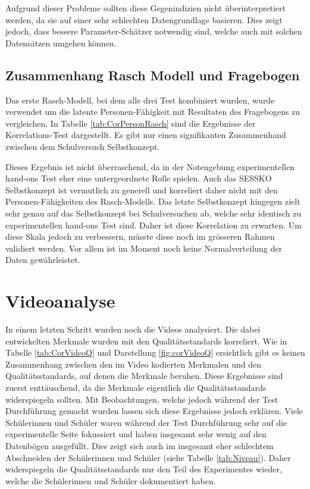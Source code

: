 Aufgrund dieser Probleme sollten diese Gegenindizien nicht überinterpretiert werden, da sie auf einer sehr schlechten Datengrundlage basieren. Dies zeigt jedoch, dass bessere Parameter-Schätzer notwendig sind, welche auch mit solchen Datensätzen umgehen können.

\subsection{Zusammenhang Rasch Modell und Fragebogen}

Das erste Rasch-Modell, bei dem alle drei Test kombiniert wurden, wurde verwendet um die latente Personen-Fähigkeit mit Resultaten des Fragebogens zu vergleichen. In Tabelle \ref{tab:CorPersonRasch} sind die Ergebnisse der Korrelations-Test dargestellt. Es gibt nur einen signifikanten Zusammenhand zwischen dem Schulversuch Selbstkonzept. 

Dieses Ergebnis ist nicht überraschend, da in der Notengebung experimentellen hand-ons Test eher eine untergeordnete Rolle spielen. Auch das SESSKO Selbstkonzept \citep{Schone2002} ist vermutlich zu generell und korreliert daher nicht mit den Personen-Fähigkeiten des Rasch-Modells. Das letzte Selbstkonzept hingegen zielt sehr genau auf das Selbstkonzept bei Schulversuchen ab, welche sehr identisch zu experimentellen hand-ons Test sind. Daher ist diese Korrelation zu erwarten. Um diese Skala jedoch zu verbessern, müsste diese noch im grösseren Rahmen validiert werden. Vor allem ist im Moment noch keine Normalverteilung der Daten gewährleistet.

\section{Videoanalyse}

In einem letzten Schritt wurden noch die Videos analysiert. Die dabei entwickelten Merkmale wurden mit den Qualitätsstandards korreliert. Wie in Tabelle \ref{tab:CorVideoQ} und Darstellung \ref{fig:corVideoQ} ersichtlich gibt es keinen Zusammenhang zwischen den im Video kodierten Merkmalen und den Qualitätsstandards, auf denen die Merkmale beruhen. Diese Ergebnisse sind zuerst enttäuschend, da die Merkmale eigentlich die Qualitätsstandards widerspiegeln sollten. Mit Beobachtungen, welche jedoch während der Test Durchführung gemacht wurden lassen sich diese Ergebnisse jedoch erklären. Viele Schülerinnen und Schüler waren während der Test Durchführung sehr auf die experimentelle Seite fokussiert und haben insgesamt sehr wenig auf den Datenbögen ausgefüllt. Dies zeigt sich auch im insgesamt eher schlechtem Abschneiden der Schülerinnen und Schüler (siehe Tabelle \ref{tab:Niveau}). Daher widerspiegeln die Qualitätsstandards nur den Teil des Experimentes wieder, welche die Schülerinnen und Schüler dokumentiert haben. 

